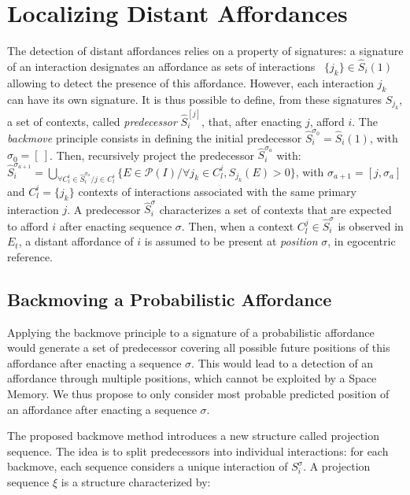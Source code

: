 \documentclass[conference]{IEEEtran}
\begin{document}
\section{Localizing Distant Affordances}\label{localize}


The detection of distant affordances relies on a property of signatures: a signature of an interaction designates an affordance as sets of interactions ~$\{j_k\} \in \hat{S}_i(1)$ allowing to detect the presence of this affordance.
However, each interaction $j_k$ can have its own signature. 
It is thus possible to define, from these signatures $S_{j_k}$, a set of contexts, called \textit{predecessor} $\hat{S}_i^{[j]}$, that, after enacting $j$, afford $i$. 
The \textit{backmove} principle consists in defining the initial predecessor $\hat{S}_i^{\sigma_0}=\hat{S}_i(1)$, with $\sigma_0=[~]$. 
Then, recursively project the predecessor $\hat{S}_i^{\sigma_a}$ with:
$\hat{S}_i^{\sigma_{a+1}}\!=\!\bigcup_{\forall C_l^i \in \hat{S}_i^{\sigma_a} / j \in C_l^i} \{E \in \mathcal{P}(I) / \forall j_k \in C_l^i, S_{j_k}(E)\!>\!0\}$,
with $\sigma_{a+1}=[j,\sigma_a]$ and $C_l^i=\{j_k\}$ contexts of interactions associated with the same primary interaction $j$.
A predecessor $\hat{S}_i^\sigma$ characterizes a set of contexts that are expected to afford $i$ after enacting sequence $\sigma$.
Then, when a context $C_l^j \in \hat{S}_i^\sigma$ is observed in $E_t$, a distant affordance of $i$ is assumed to be present at \textit{position} $\sigma$, in egocentric reference.


\subsection{Backmoving a Probabilistic Affordance}\label{backmove}

Applying the backmove principle to a signature of a probabilistic affordance would generate a set of predecessor covering all possible future positions of this affordance after enacting a sequence $\sigma$. This would lead to a detection of an affordance through multiple positions, which cannot be exploited by a Space Memory.
We thus propose to only consider most probable predicted position of an affordance after enacting a sequence $\sigma$.

The proposed backmove method introduces a new structure called projection sequence. The idea is to split predecessors into individual interactions: for each backmove, each sequence considers a unique interaction of $S_i^{\sigma}$.
A projection sequence $\xi$ is a structure characterized by:
\end{document}
